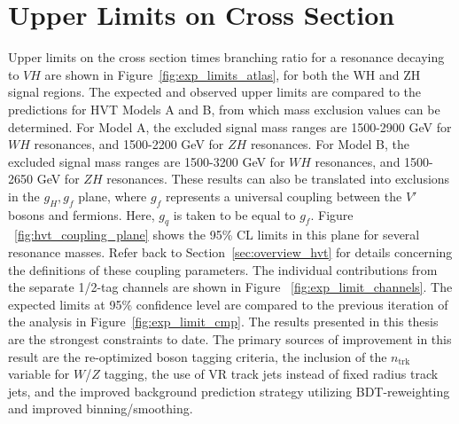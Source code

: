 \section{Upper Limits on Cross Section}
Upper limits on the cross section times branching ratio for a resonance decaying to $VH$ are shown in Figure~\ref{fig:exp_limits_atlas}, for both the WH and ZH signal regions.
The expected and observed upper limits are compared to the predictions for HVT Models A and B, from which mass exclusion values can be determined.
For Model A, the excluded signal mass ranges are 1500-2900 GeV for $WH$ resonances, and 1500-2200 GeV for $ZH$ resonances.
For Model B, the excluded signal mass ranges are 1500-3200 GeV for $WH$ resonances, and 1500-2650 GeV for $ZH$ resonances.
These results can also be translated into exclusions in the {$g_H,g_f$} plane, where $g_f$ represents a universal coupling between the $V'$ bosons and fermions.
Here, $g_q$ is taken to be equal to $g_f$. Figure ~\ref{fig:hvt_coupling_plane} shows the 95\% CL limits in this plane for several resonance masses.
Refer back to Section~\ref{sec:overview_hvt} for details concerning the definitions of these coupling parameters.
The individual contributions from the separate 1/2-tag channels are shown in Figure ~\ref{fig:exp_limit_channels}.
The expected limits at 95\% confidence level are compared to the previous iteration of the analysis in Figure~\ref{fig:exp_limit_cmp}.
The results presented in this thesis are the strongest constraints to date.
The primary sources of improvement in this result are the re-optimized boson tagging criteria, the inclusion of the $n_{\mathrm{trk}}$ variable for $W$/$Z$ tagging, the use of VR track jets instead of fixed radius track jets, and the improved background prediction strategy utilizing BDT-reweighting and improved binning/smoothing.

